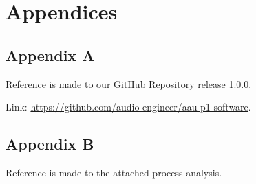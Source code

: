 \chapter*{Appendices}

\section*{Appendix A}\label{sec:appendix-b}

Reference is made to our \href{https://github.com/audio-engineer/aau-p1-software}{GitHub Repository} release 1.0.0.

Link: \url{https://github.com/audio-engineer/aau-p1-software}.

\section*{Appendix B}\label{sec:appendix-c}

Reference is made to the attached process analysis.
